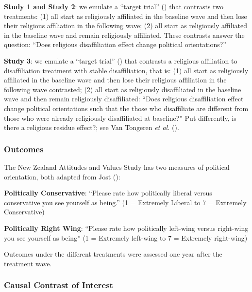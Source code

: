 \documentclass[
  singlecolumn]{article}
\begin{document}
\textbf{Study 1 and Study 2}: we emulate a ``target trial''
() that
contrasts two treatments: (1) all start as religiously affiliated in the
baseline wave and then lose their religious affiliation in the following
wave; (2) all start as religiously affiliated in the baseline wave and
remain religiously affiliated. These contrasts answer the question:
``Does religious disaffiliation effect change political orientations?''

\textbf{Study 3}: we emulate a ``target trial''
() that
contrasts a religious affiliation to disaffiliation treatment with
stable disaffiliation, that is: (1) all start as religiously affiliated
in the baseline wave and then lose their religious affiliation in the
following wave contrasted; (2) all start as religiously disaffiliated in
the baseline wave and then remain religiously disaffiliated: ``Does
religious disaffiliation effect change political orientations such that
the those who disaffiliate are different from those who were already
religiously disaffiliated at baseline?'' Put differently, is there a
religious residue effect?; see Van Tongeren \emph{et al.}
().

\subsubsection{Outcomes}\label{outcomes}

The New Zealand Attitudes and Values Study has two measures of political
orientation, both adapted from Jost
():

\textbf{Politically Conservative}: ``Please rate how politically liberal
versus conservative you see yourself as being.'' (1 = Extremely Liberal
to 7 = Extremely Conservative)

\textbf{Politically Right Wing}: ``Please rate how politically left-wing
versus right-wing you see yourself as being'' (1 = Extremely left-wing
to 7 = Extremely right-wing)

Outcomes under the different treatments were assessed one year after the
treatment wave.

\subsubsection{Causal Contrast of
Interest}\label{causal-contrast-of-interest}
\end{document}
